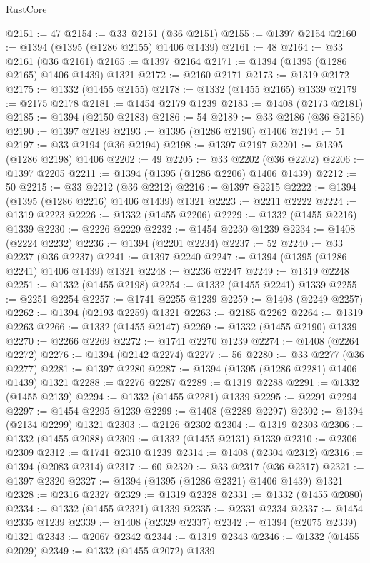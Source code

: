 \begin{lexlean}{RustCore}
\begin{coremodule}
@2151 := 47
@2154 := @33 @2151 (@36 @2151)
@2155 := @1397 @2154
@2160 := @1394 (@1395 (@1286 @2155) @1406 @1439)
@2161 := 48
@2164 := @33 @2161 (@36 @2161)
@2165 := @1397 @2164
@2171 := @1394 (@1395 (@1286 @2165) @1406 @1439) @1321
@2172 := @2160 @2171
@2173 := @1319 @2172
@2175 := @1332 (@1455 @2155)
@2178 := @1332 (@1455 @2165) @1339
@2179 := @2175 @2178
@2181 := @1454 @2179 @1239
@2183 := @1408 (@2173 @2181)
@2185 := @1394 (@2150 @2183)
@2186 := 54
@2189 := @33 @2186 (@36 @2186)
@2190 := @1397 @2189
@2193 := @1395 (@1286 @2190) @1406
@2194 := 51
@2197 := @33 @2194 (@36 @2194)
@2198 := @1397 @2197
@2201 := @1395 (@1286 @2198) @1406
@2202 := 49
@2205 := @33 @2202 (@36 @2202)
@2206 := @1397 @2205
@2211 := @1394 (@1395 (@1286 @2206) @1406 @1439)
@2212 := 50
@2215 := @33 @2212 (@36 @2212)
@2216 := @1397 @2215
@2222 := @1394 (@1395 (@1286 @2216) @1406 @1439) @1321
@2223 := @2211 @2222
@2224 := @1319 @2223
@2226 := @1332 (@1455 @2206)
@2229 := @1332 (@1455 @2216) @1339
@2230 := @2226 @2229
@2232 := @1454 @2230 @1239
@2234 := @1408 (@2224 @2232)
@2236 := @1394 (@2201 @2234)
@2237 := 52
@2240 := @33 @2237 (@36 @2237)
@2241 := @1397 @2240
@2247 := @1394 (@1395 (@1286 @2241) @1406 @1439) @1321
@2248 := @2236 @2247
@2249 := @1319 @2248
@2251 := @1332 (@1455 @2198)
@2254 := @1332 (@1455 @2241) @1339
@2255 := @2251 @2254
@2257 := @1741 @2255 @1239
@2259 := @1408 (@2249 @2257)
@2262 := @1394 (@2193 @2259) @1321
@2263 := @2185 @2262
@2264 := @1319 @2263
@2266 := @1332 (@1455 @2147)
@2269 := @1332 (@1455 @2190) @1339
@2270 := @2266 @2269
@2272 := @1741 @2270 @1239
@2274 := @1408 (@2264 @2272)
@2276 := @1394 (@2142 @2274)
@2277 := 56
@2280 := @33 @2277 (@36 @2277)
@2281 := @1397 @2280
@2287 := @1394 (@1395 (@1286 @2281) @1406 @1439) @1321
@2288 := @2276 @2287
@2289 := @1319 @2288
@2291 := @1332 (@1455 @2139)
@2294 := @1332 (@1455 @2281) @1339
@2295 := @2291 @2294
@2297 := @1454 @2295 @1239
@2299 := @1408 (@2289 @2297)
@2302 := @1394 (@2134 @2299) @1321
@2303 := @2126 @2302
@2304 := @1319 @2303
@2306 := @1332 (@1455 @2088)
@2309 := @1332 (@1455 @2131) @1339
@2310 := @2306 @2309
@2312 := @1741 @2310 @1239
@2314 := @1408 (@2304 @2312)
@2316 := @1394 (@2083 @2314)
@2317 := 60
@2320 := @33 @2317 (@36 @2317)
@2321 := @1397 @2320
@2327 := @1394 (@1395 (@1286 @2321) @1406 @1439) @1321
@2328 := @2316 @2327
@2329 := @1319 @2328
@2331 := @1332 (@1455 @2080)
@2334 := @1332 (@1455 @2321) @1339
@2335 := @2331 @2334
@2337 := @1454 @2335 @1239
@2339 := @1408 (@2329 @2337)
@2342 := @1394 (@2075 @2339) @1321
@2343 := @2067 @2342
@2344 := @1319 @2343
@2346 := @1332 (@1455 @2029)
@2349 := @1332 (@1455 @2072) @1339

\end{coremodule}
\end{lexlean}
